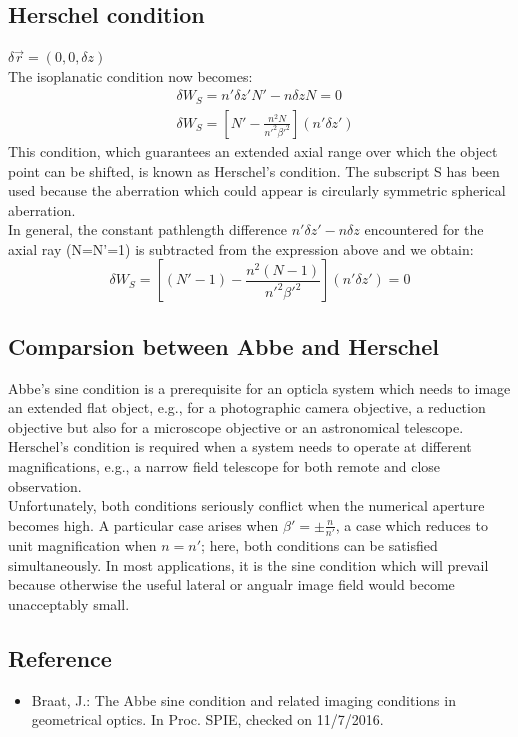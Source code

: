 \documentclass[../main.tex]{subfiles}
\begin{document}
	\subsection{Herschel condition}
	$\delta \vec{r}=(0,0,\delta{z})$\\
	The isoplanatic condition now becomes:\\
	\begin{align}
	&\delta{W_S}=n'\delta{z'}{N'}-n\delta{z}{N}=0\\
	&\delta{W_S}=\left[N'-\frac{n^2N}{n'^2\beta'^2}\right](n'\delta{z'})
	\end{align}	
	This condition, which guarantees an extended axial range over which the object point can be shifted, is known as Herschel's condition. The subscript S has been used because the aberration which could appear is circularly symmetric spherical aberration.\\
	In general, the constant pathlength difference $n'\delta z'-n\delta z$ encountered for the axial ray (N=N'=1) is subtracted from the expression above and we obtain:
	\begin{equation}
	\delta{W_S}=\left[(N'-1)-\frac{n^2(N-1)}{n'^2\beta'^2}\right](n'\delta{z'})=0
	\end{equation}
	\subsection{Comparsion between Abbe and Herschel}
	Abbe's sine condition is a prerequisite for an opticla system which needs to image an extended flat object, e.g., for a photographic camera objective, a reduction objective but also for a microscope objective or an astronomical telescope.\\
	Herschel's condition is required when a system needs to operate at different magnifications, e.g., a narrow field telescope for both remote and close observation.\\
	Unfortunately, both conditions seriously conflict when the numerical aperture becomes high. A particular case arises when $\beta'=\pm\frac{n}{n'}$, a case which reduces to unit magnification when $n=n'$; here, both conditions can be satisfied simultaneously. In most applications, it is the sine condition which will prevail because otherwise the useful lateral or angualr image field would become unacceptably small.
	\subsection{Reference}
	\begin{itemize}  
	\item Braat, J.: The Abbe sine condition and related imaging conditions in geometrical optics. In Proc. SPIE, checked on 11/7/2016.
	\end{itemize}
\end{document}
